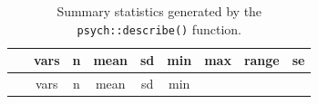 \documentclass[]{article}
\theoremstyle{definition}
\theoremstyle{definition}
\theoremstyle{definition}
\theoremstyle{remark}
\begin{document}
\begin{longtable}[]{@{}ccccccccc@{}}
\caption{Summary statistics generated by the \texttt{psych::describe()}
function.}\tabularnewline
\toprule
\begin{minipage}[b]{0.15\columnwidth}\centering\strut
~\strut
\end{minipage} & \begin{minipage}[b]{0.07\columnwidth}\centering\strut
vars\strut
\end{minipage} & \begin{minipage}[b]{0.06\columnwidth}\centering\strut
n\strut
\end{minipage} & \begin{minipage}[b]{0.08\columnwidth}\centering\strut
mean\strut
\end{minipage} & \begin{minipage}[b]{0.08\columnwidth}\centering\strut
sd\strut
\end{minipage} & \begin{minipage}[b]{0.06\columnwidth}\centering\strut
min\strut
\end{minipage} & \begin{minipage}[b]{0.07\columnwidth}\centering\strut
max\strut
\end{minipage} & \begin{minipage}[b]{0.08\columnwidth}\centering\strut
range\strut
\end{minipage} & \begin{minipage}[b]{0.08\columnwidth}\centering\strut
se\strut
\end{minipage}\tabularnewline
\midrule
\endfirsthead
\toprule
\begin{minipage}[b]{0.15\columnwidth}\centering\strut
~\strut
\end{minipage} & \begin{minipage}[b]{0.07\columnwidth}\centering\strut
vars\strut
\end{minipage} & \begin{minipage}[b]{0.06\columnwidth}\centering\strut
n\strut
\end{minipage} & \begin{minipage}[b]{0.08\columnwidth}\centering\strut
mean\strut
\end{minipage} & \begin{minipage}[b]{0.08\columnwidth}\centering\strut
sd\strut
\end{minipage} & \begin{minipage}[b]{0.06\columnwidth}\centering\strut
min\strut
\end{minipage} & \begin{minipage}[b]{0.07\columnwidth}\centering\strut

\end{minipage}
\end{longtable}
\end{document}

